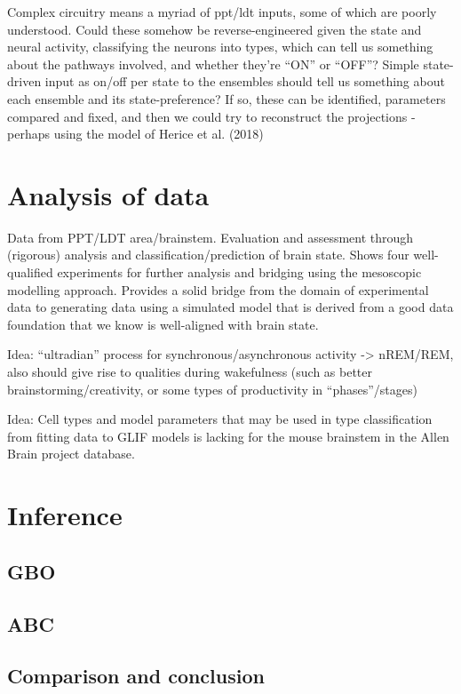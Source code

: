\documentclass[mphil,deptreport,ai]{infthesis} %
\begin{document}
Complex circuitry means a myriad of ppt/ldt inputs, some of which are poorly understood.
Could these somehow be reverse-engineered given the state and neural activity, classifying the neurons into types, which can tell us something about the pathways involved, and whether they’re “ON” or “OFF”?
Simple state-driven input as on/off per state to the ensembles should tell us something about each ensemble and its state-preference? If so, these can be identified, parameters compared and fixed, and then we could try to reconstruct the projections - perhaps using the model of Herice et al. (2018)


\section{Analysis of data}
Data from PPT/LDT area/brainstem. Evaluation and assessment through (rigorous) analysis and classification/prediction of brain state. Shows four well-qualified experiments for further analysis and bridging using the mesoscopic modelling approach.
Provides a solid bridge from the domain of experimental data to generating data using a simulated model that is derived from a good data foundation that we know is well-aligned with brain state.

Idea: “ultradian” process for synchronous/asynchronous activity -> nREM/REM, also should give rise to qualities during wakefulness (such as better brainstorming/creativity, or some types of productivity in “phases”/stages)

Idea: Cell types and model parameters that may be used in type classification from fitting data to GLIF models is lacking for the mouse brainstem in the Allen Brain project database.

\section{Inference}

\subsection{GBO}

\subsection{ABC}

\subsection{Comparison and conclusion}
\end{document}
